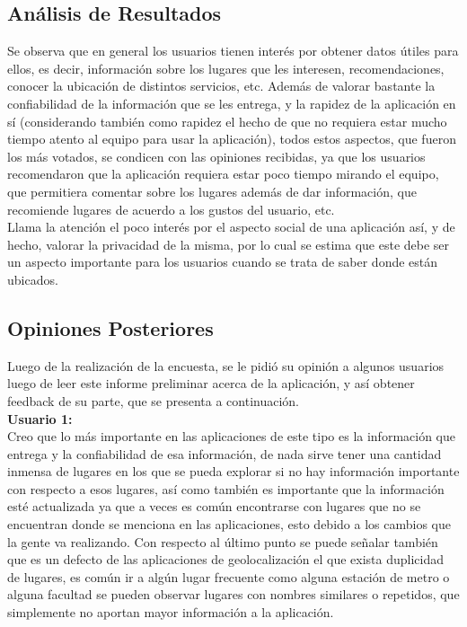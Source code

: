 \documentclass[10pt,letterpaper]{article}
\begin{document}
\subsection{Análisis de Resultados}

Se observa que en general los usuarios tienen interés por obtener datos útiles para ellos, es decir, información sobre los lugares que les interesen, recomendaciones, conocer la ubicación de distintos servicios, etc. Además de valorar bastante la confiabilidad de la información que se les entrega, y la rapidez de la aplicación en sí (considerando también como rapidez el hecho de que no requiera estar mucho tiempo atento al equipo para usar la aplicación), todos estos aspectos, que fueron los más votados, se condicen con las opiniones recibidas, ya que los usuarios recomendaron que la aplicación requiera estar poco tiempo mirando el equipo, que permitiera comentar sobre los lugares además de dar información, que recomiende lugares de acuerdo a los gustos del usuario, etc.\\

Llama la atención el poco interés por el aspecto social de una aplicación así, y de hecho, valorar la privacidad de la misma, por lo cual se estima que este debe ser un aspecto importante para los usuarios cuando se trata de saber donde están ubicados.\\

\subsection{Opiniones Posteriores}

Luego de la realización de la encuesta, se le pidió su opinión a algunos usuarios luego de leer este informe preliminar acerca de la aplicación, y así obtener feedback de su parte, que se presenta a continuación.\\

\textbf{Usuario 1:}\\

Creo que lo más importante en las aplicaciones de este tipo es la información que entrega y la confiabilidad de esa información, de nada sirve tener una cantidad inmensa de lugares en los que se pueda explorar si no hay información importante con respecto a esos lugares, así como también es importante que la información esté actualizada ya que a veces es común encontrarse con lugares que no se encuentran donde se menciona en las aplicaciones, esto debido a los cambios que la gente va realizando. Con respecto al último punto se puede señalar también que es un defecto de las aplicaciones de geolocalización el que exista duplicidad de lugares, es común ir a algún lugar frecuente como alguna estación de metro o alguna facultad se pueden observar lugares con nombres similares o repetidos, que simplemente no aportan mayor información a la aplicación.\\
\end{document}
